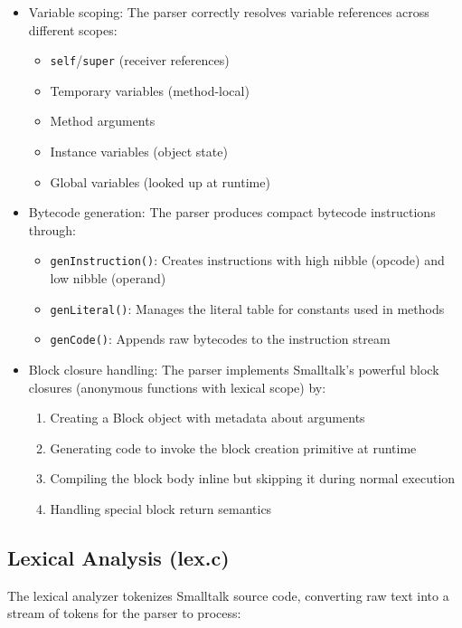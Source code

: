 \documentclass[12pt,a4paper]{report}
\begin{document}
\begin{itemize}
    \item Variable scoping: The parser correctly resolves variable references across different scopes:
    \begin{itemize}
        \item \texttt{self}/\texttt{super} (receiver references)
        \item Temporary variables (method-local)
        \item Method arguments
        \item Instance variables (object state)
        \item Global variables (looked up at runtime)
    \end{itemize}

    \item Bytecode generation: The parser produces compact bytecode instructions through:
    \begin{itemize}
        \item \texttt{genInstruction()}: Creates instructions with high nibble (opcode) and low nibble (operand)
        \item \texttt{genLiteral()}: Manages the literal table for constants used in methods
        \item \texttt{genCode()}: Appends raw bytecodes to the instruction stream
    \end{itemize}

    \item Block closure handling: The parser implements Smalltalk's powerful block closures (anonymous functions with lexical scope) by:
    \begin{enumerate}
        \item Creating a Block object with metadata about arguments
        \item Generating code to invoke the block creation primitive at runtime
        \item Compiling the block body inline but skipping it during normal execution
        \item Handling special block return semantics
    \end{enumerate}
\end{itemize}

\subsection{Lexical Analysis (lex.c)}
The lexical analyzer tokenizes Smalltalk source code, converting raw text into a stream of tokens for the parser to process:
\end{document}
